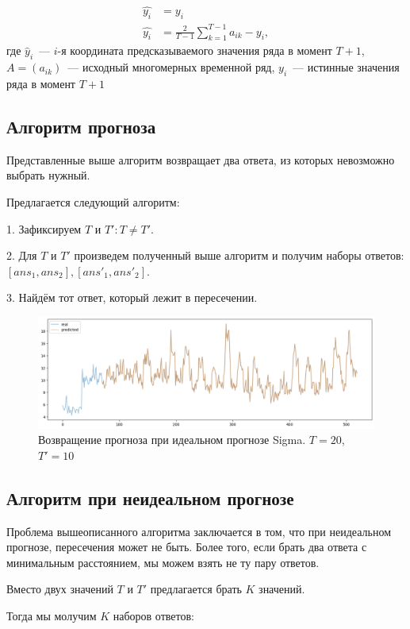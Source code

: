 \documentclass{article}
\begin{document}
\begin{align*}
	\hat{y_i} &= y_i\\
	\hat{y_i} &= \frac{2}{T-1} \sum_{k=1}^{T-1} a_{ik} - y_i,
\end{align*}
где $\hat{y}_i$~--- $i$-я координата предсказываемого значения ряда в момент $T+1$, $A=(a_{ik})$~--- исходный многомерных временной ряд, $y_i$~--- истинные значения ряда в момент $T+1$

\subsection{Алгоритм прогноза}

Представленные выше алгоритм возвращает два ответа, из которых невозможно выбрать нужный.

Предлагается следующий алгоритм:

1. Зафиксируем $T$ и $T': T \neq T'$.

2. Для $T$ и $T'$ произведем полученный выше алгоритм и получим наборы ответов: $[ans_1, ans_2], [ans'_1, ans'_2]$.

3. Найдём тот ответ, который лежит в пересечении.


\begin{figure}
	\centering
	\includegraphics[width=\textwidth]{TwoTAlgo.png}
	\caption{Возвращение прогноза при идеальном прогнозе Sigma. $T=20$, $T'=10$}
	\label{fig:fig3}
\end{figure}

\subsection{Алгоритм при неидеальном прогнозе}

Проблема вышеописанного алгоритма заключается в том, что при неидеальном прогнозе, пересечения может не быть. Более того, если брать два ответа с минимальным расстоянием, мы можем взять не ту пару ответов.

Вместо двух значений  $T$ и $T'$ предлагается брать $K$ значений.

Тогда мы молучим $K$ наборов ответов:
\end{document}
